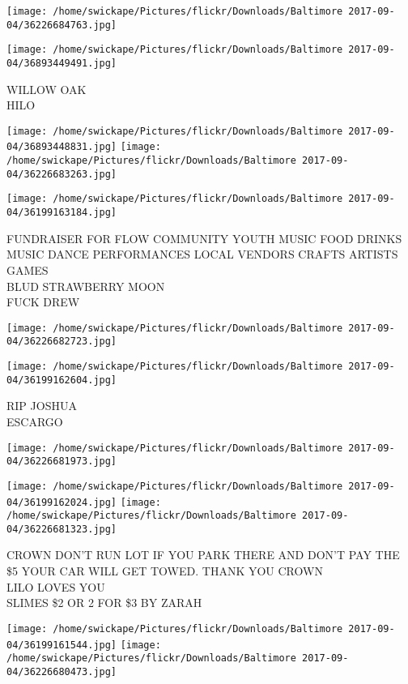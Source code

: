 \documentclass[10pt,letterpaper]{article}
\begin{document}
\texttt{[image: /home/swickape/Pictures/flickr/Downloads/Baltimore 2017-09-04/36226684763.jpg]}

\vspace{0.25in}
\texttt{[image: /home/swickape/Pictures/flickr/Downloads/Baltimore 2017-09-04/36893449491.jpg]}

WILLOW OAK\\
HILO
\pagebreak

\texttt{[image: /home/swickape/Pictures/flickr/Downloads/Baltimore 2017-09-04/36893448831.jpg]}
\texttt{[image: /home/swickape/Pictures/flickr/Downloads/Baltimore 2017-09-04/36226683263.jpg]}

\vspace{0.25in}
\texttt{[image: /home/swickape/Pictures/flickr/Downloads/Baltimore 2017-09-04/36199163184.jpg]}

FUNDRAISER FOR FLOW COMMUNITY YOUTH MUSIC FOOD DRINKS MUSIC DANCE PERFORMANCES LOCAL VENDORS CRAFTS ARTISTS GAMES\\
BLUD STRAWBERRY MOON\\
FUCK DREW
\pagebreak

\texttt{[image: /home/swickape/Pictures/flickr/Downloads/Baltimore 2017-09-04/36226682723.jpg]}

\vspace{0.25in}
\texttt{[image: /home/swickape/Pictures/flickr/Downloads/Baltimore 2017-09-04/36199162604.jpg]}

RIP JOSHUA\\
ESCARGO
\pagebreak

\texttt{[image: /home/swickape/Pictures/flickr/Downloads/Baltimore 2017-09-04/36226681973.jpg]}

\vspace{0.25in}
\texttt{[image: /home/swickape/Pictures/flickr/Downloads/Baltimore 2017-09-04/36199162024.jpg]}
\texttt{[image: /home/swickape/Pictures/flickr/Downloads/Baltimore 2017-09-04/36226681323.jpg]}

CROWN DON'T RUN LOT IF YOU PARK THERE AND DON'T PAY THE \$5 YOUR CAR WILL GET TOWED.  THANK YOU CROWN\\
LILO LOVES YOU\\
SLIMES \$2 OR 2 FOR \$3 BY ZARAH
\pagebreak

\texttt{[image: /home/swickape/Pictures/flickr/Downloads/Baltimore 2017-09-04/36199161544.jpg]}
\texttt{[image: /home/swickape/Pictures/flickr/Downloads/Baltimore 2017-09-04/36226680473.jpg]}
\end{document}
